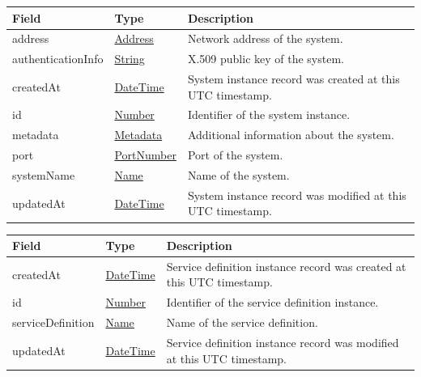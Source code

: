 \documentclass[a4paper]{arrowhead}
\newcommand{\pref}[1]{{\textcolor{ArrowheadGrey}{\hyperref[sec:model:primitives:#1]{#1}}}}
\begin{document}
\label{sec:model:SystemRecord}

\begin{table}[ht!]
\begin{tabularx}{\textwidth}{| p{4.25cm} | p{3.5cm} | X |} \hline
\rowcolor{gray!33} Field & Type & Description \\ \hline

address &\pref{Address} & Network address of the system. \\ \hline
authenticationInfo &\pref{String} & X.509 public key of the system. \\ \hline
createdAt & \pref{DateTime} & System instance record was created at this UTC time\-stamp. \\ \hline
id & \pref{Number} & Identifier of the system instance. \\ \hline
metadata &\hyperref[sec:model:Metadata]{Metadata} & Additional information about the system. \\ \hline
port &\pref{PortNumber} & Port of the system. \\ \hline
systemName &\pref{Name} & Name of the system. \\ \hline
updatedAt & \pref{DateTime} & System instance record was modified at this UTC time\-stamp. \\ \hline
\end{tabularx}
\end{table}

\clearpage

\label{sec:model:ServiceDefinitionRecord}

\begin{table}[ht!]
\begin{tabularx}{\textwidth}{| p{4.25cm} | p{3.5cm} | X |} \hline
\rowcolor{gray!33} Field & Type & Description \\ \hline
createdAt & \pref{DateTime} & Service definition instance record was created at this UTC time\-stamp. \\ \hline
id & \pref{Number} & Identifier of the service definition instance. \\ \hline
serviceDefinition &\pref{Name}  & Name of the service definition. \\ \hline
updatedAt & \pref{DateTime} & Service definition instance record was modified at this UTC time\-stamp. \\ \hline
\end{tabularx}
\end{table}
\end{document}
